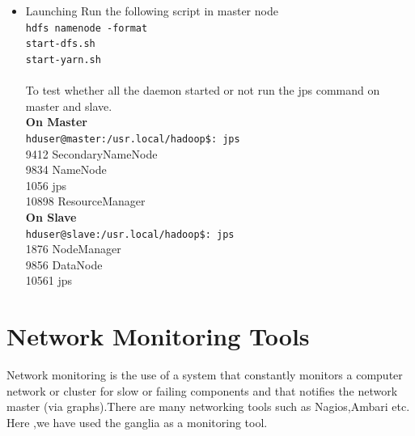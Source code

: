 \documentclass[12pt]{book}
\newcommand{\shellcmd}[1]{\\\indent\texttt{\footnotesize #1}\\}
\begin{document}
\begin{itemize}
\item Launching 
Run the following script in master node
\shellcmd{hdfs namenode -format\\\indent 
                  start-dfs.sh\\\indent 
                  start-yarn.sh\\\indent}
To test whether all the daemon started or not run the jps command on master and slave.\\
\textbf{On Master}
\shellcmd{hduser@master:/usr.local/hadoop\$: jps}
9412   SecondaryNameNode \\
9834   NameNode\\
1056   jps\\
10898  ResourceManager\\
\textbf{On Slave}
\shellcmd{hduser@slave:/usr.local/hadoop\$: jps}
1876   NodeManager \\
9856   DataNode\\
10561  jps\\

\end{itemize}
 
\section{Network Monitoring Tools}
Network monitoring is the use of a system that constantly monitors a computer network or cluster for slow or failing components and that notifies the network 
master (via graphs).There are many networking tools such as Nagios,Ambari etc.
Here ,we have used the ganglia as a monitoring tool.
\end{document}

